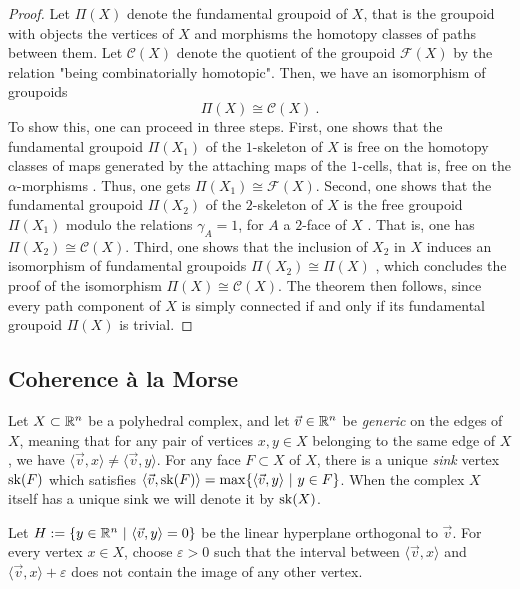 \begin{proof}
    Let $\Pi(X)$ denote the fundamental groupoid of $X$, that is the groupoid with objects the vertices of $X$ and morphisms the homotopy classes of paths between them.
    Let $\mathcal{C}(X)$ denote the quotient of the groupoid $\mathcal{F}(X)$ by the relation "being combinatorially homotopic". 
    Then, we have an isomorphism of groupoids \[ \Pi(X) \cong \mathcal{C}(X) \ . \]
    To show this, one can proceed in three steps. 
    First, one shows that the fundamental groupoid $\Pi(X_1)$ of the $1$-skeleton of $X$ is free on the homotopy classes of maps generated by the attaching maps of the $1$-cells, that is, free on the $\alpha$-morphisms \cite[9.1.5]{Brown2006}.
    Thus, one gets $\Pi(X_1) \cong \mathcal{F}(X)$. 
    Second, one shows that the fundamental groupoid $\Pi(X_2)$ of the $2$-skeleton of $X$ is the free groupoid $\Pi(X_1)$ modulo the relations $\gamma_A=1$, for $A$ a $2$-face of $X$ \cite[9.1.6]{Brown2006}. 
    That is, one has $\Pi(X_2) \cong \mathcal{C}(X)$.
    Third, one shows that the inclusion of $X_2$ in $X$ induces an isomorphism of fundamental groupoids $\Pi(X_2) \cong \Pi(X)$ \cite[9.1.7]{Brown2006}, which concludes the proof of the isomorphism $\Pi(X) \cong \mathcal{C}(X)$.
    The theorem then follows, since every path component of $X$ is simply connected if and only if its fundamental groupoid $\Pi(X)$ is trivial.  
\end{proof}

\subsection{Coherence \`a la Morse}

Let $X\subset \mathbb R^n$ be a polyhedral complex, and let $\vec v \in \mathbb R^n$ be \emph{generic} on the edges of $X$, meaning that for any pair of vertices $x,y \in X$ belonging to the same edge of $X$, we have $\langle \vec v , x \rangle \neq \langle \vec v, y\rangle$.  
For any face $F \subset X$ of $X$, there is a unique \emph{sink} vertex $\mathrm{sk}(F)$ which satisfies $\langle \vec v , \mathrm{sk}(F) \rangle = \max \{\langle \vec v , y \rangle \ | \ y \in F \}$.
When the complex $X$ itself has a unique sink we will denote it by $\mathrm{sk}(X)$. 

Let $H:=\{y \in \mathbb R^n \ | \ \langle \vec v , y \rangle = 0\}$ be the linear hyperplane orthogonal to $\vec v$.  
For every vertex $x \in X$, choose $\varepsilon >0$ such that the interval between $\langle \vec v , x \rangle$ and $\langle \vec v , x \rangle + \varepsilon$ does not contain the image of any other vertex. 

